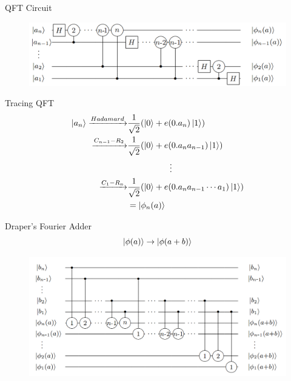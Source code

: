 \documentclass{beamer}
\begin{document}
\begin{frame}{QFT Circuit}
	\begin{figure}[h]
		\centering
		\includegraphics[width=\linewidth]{./qft.png}
	\end{figure}
\end{frame}

\begin{frame}{Tracing QFT}
	\begin{align*}
		\ket{a_n}
		\xrightarrow{Hadamard}& 
		\frac{1}{\sqrt{2}} (\ket{0} + e(0.a_n) \ket{1})\\
		\xrightarrow{C_{n-1}-R_2}& 
		\frac{1}{\sqrt{2}} (\ket{0} + e(0.a_n a_{n-1}) \ket{1})\\
		&\quad\quad\quad\quad\quad\vdots\\
		\xrightarrow{C_{1}-R_n}& 
		\frac{1}{\sqrt{2}} (\ket{0} + e(0.a_n a_{n-1}\cdots a_1) \ket{1})\\
		&= \ket{\phi_n (a) }
	\end{align*}
	
\end{frame}

\begin{frame}{Draper's Fourier Adder}
	\begin{equation*}
		\ket{\phi(a)} \to \ket{\phi (a+b) }
	\end{equation*}
	
	\begin{figure}[h]
		\centering
		\includegraphics[width=\linewidth]{./draper.png}
	\end{figure}
\end{frame}
\end{document}
